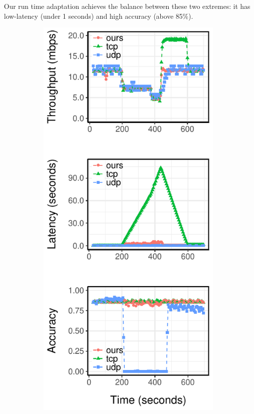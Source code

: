 Our run time adaptation achieves the balance between these two extremes: it has
low-latency (under 1 seconds) and high accuracy (above 85\%).

\begin{figure}[!htb]
  \centering
  \begin{subfigure}[t]{0.33\textwidth}
    \centering
    \includegraphics[width=\textwidth]{figures/ped-runtime-verticle.pdf}

\end{subfigure}
\end{figure}
